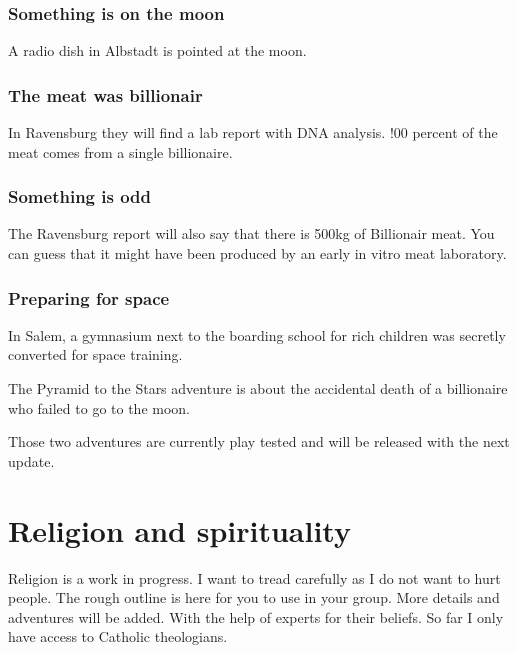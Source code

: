 \subsubsection{Something is on the moon}

A radio dish in Albstadt is pointed at the moon.

\subsubsection{The meat was billionair}

In Ravensburg they will find a lab report with DNA analysis. !00 percent of the meat comes from a single billionaire.

\subsubsection{Something is odd}

The Ravensburg report will also say that there is 500kg of Billionair meat. You can guess that it might have been produced by an early in vitro meat laboratory.

\subsubsection{Preparing for space}

In Salem, a gymnasium next to the boarding school for rich children was secretly converted for space training.

The Pyramid to the Stars adventure is about the accidental death of a billionaire who failed to go to the moon.

\begin{warning}
    Those two adventures are currently play tested and will be released with the next update.
\end{warning}
\newpage



\section{Religion and spirituality}

\begin{warning}
    Religion is a work in progress. I want to tread carefully as I do not want to hurt people. The rough outline is here for you to use in your group. More details and adventures will be added. With the help of experts for their beliefs. So far I only have access to Catholic theologians.
\end{warning}

